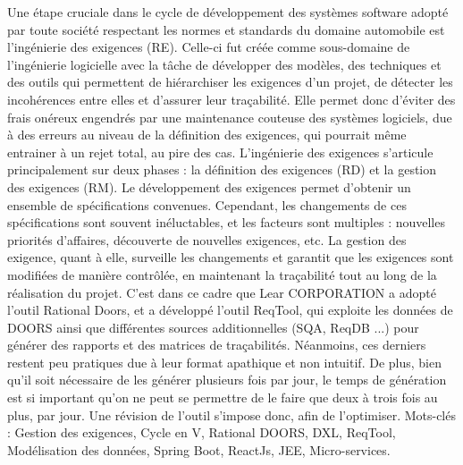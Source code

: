 Une étape cruciale dans le cycle de développement des systèmes software adopté par toute société respectant
les normes et standards du domaine automobile est l’ingénierie des exigences (RE). Celle-ci fut créée comme
sous-domaine de l’ingénierie logicielle avec la tâche de développer des modèles, des techniques et des outils qui
permettent de hiérarchiser les exigences d’un projet, de détecter les incohérences entre elles et d’assurer leur
traçabilité. Elle permet donc d’éviter des frais onéreux engendrés par une maintenance couteuse des systèmes
logiciels, due à des erreurs au niveau de la définition des exigences, qui pourrait même entrainer à un rejet total,
au pire des cas.
L’ingénierie des exigences s’articule principalement sur deux phases : la définition des exigences (RD) et la
gestion des exigences (RM). Le développement des exigences permet d’obtenir un ensemble de spécifications
convenues. Cependant, les changements de ces spécifications sont souvent inéluctables, et les facteurs sont multiples : nouvelles priorités d’affaires, découverte de nouvelles exigences, etc. La gestion des exigence, quant à
elle, surveille les changements et garantit que les exigences sont modifiées de manière contrôlée, en maintenant
la traçabilité tout au long de la réalisation du projet.
C’est dans ce cadre que Lear CORPORATION a adopté l’outil Rational Doors, et a développé l’outil ReqTool, qui exploite les données de DOORS ainsi que différentes sources additionnelles (SQA, ReqDB ...) pour
générer des rapports et des matrices de traçabilités. Néanmoins, ces derniers restent peu pratiques due à leur
format apathique et non intuitif. De plus, bien qu’il soit nécessaire de les générer plusieurs fois par jour, le
temps de génération est si important qu’on ne peut se permettre de le faire que deux à trois fois au plus, par
jour. Une révision de l’outil s’impose donc, afin de l’optimiser.
Mots-clés : Gestion des exigences, Cycle en V, Rational DOORS, DXL, ReqTool, Modélisation des données,
Spring Boot, ReactJs, JEE, Micro-services.
\pagebreak